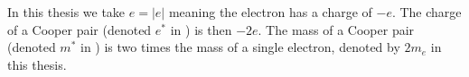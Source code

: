 In this thesis we take $e = |e|$ meaning the electron has a charge of $-e$. The charge of a Cooper pair (denoted $e^*$ in ) is then $-2e$. The mass of a Cooper pair (denoted $m^*$ in ) is two times the mass of a single electron, denoted by $2m_e$ in this thesis.